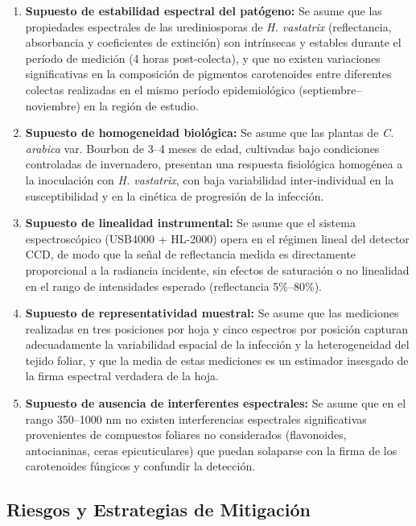 \documentclass[12pt, a4paper]{article}
\begin{document}
	\begin{enumerate}
		\item \textbf{Supuesto de estabilidad espectral del patógeno:} Se asume que las propiedades espectrales de las urediniosporas de \textit{H. vastatrix} (reflectancia, absorbancia y coeficientes de extinción) son intrínsecas y estables durante el período de medición (4 horas post-colecta), y que no existen variaciones significativas en la composición de pigmentos carotenoides entre diferentes colectas realizadas en el mismo período epidemiológico (septiembre--noviembre) en la región de estudio.
		
		\item \textbf{Supuesto de homogeneidad biológica:} Se asume que las plantas de \textit{C. arabica} var. Bourbon de 3--4 meses de edad, cultivadas bajo condiciones controladas de invernadero, presentan una respuesta fisiológica homogénea a la inoculación con \textit{H. vastatrix}, con baja variabilidad inter-individual en la susceptibilidad y en la cinética de progresión de la infección.
		
		\item \textbf{Supuesto de linealidad instrumental:} Se asume que el sistema espectroscópico (USB4000 + HL-2000) opera en el régimen lineal del detector CCD, de modo que la señal de reflectancia medida es directamente proporcional a la radiancia incidente, sin efectos de saturación o no linealidad en el rango de intensidades esperado (reflectancia 5\%--80\%).
		
		\item \textbf{Supuesto de representatividad muestral:} Se asume que las mediciones realizadas en tres posiciones por hoja y cinco espectros por posición capturan adecuadamente la variabilidad espacial de la infección y la heterogeneidad del tejido foliar, y que la media de estas mediciones es un estimador insesgado de la firma espectral verdadera de la hoja.
		
		\item \textbf{Supuesto de ausencia de interferentes espectrales:} Se asume que en el rango 350--1000 nm no existen interferencias espectrales significativas provenientes de compuestos foliares no considerados (flavonoides, antocianinas, ceras epicuticulares) que puedan solaparse con la firma de los carotenoides fúngicos y confundir la detección.
	\end{enumerate}
	
	\subsection{Riesgos y Estrategias de Mitigación}
	
\end{document}
